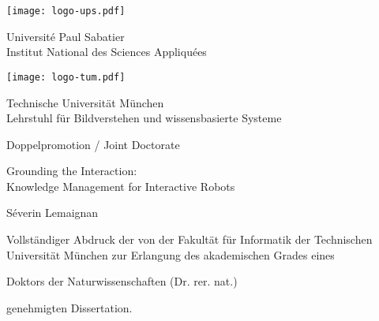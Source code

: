 \thispagestyle{empty}

\begin{center}

    \begin{minipage}{6cm}
      \begin{center}
        \texttt{[image: logo-ups.pdf]}
        \vspace{7mm}
        
        \textsf{\Large Université Paul Sabatier }\\
        \vspace{3mm}
        \textsf{\large Institut National des Sciences Appliquées}\\
      \end{center}
    \end{minipage}
    \hfill
    \begin{minipage}{6cm}
      \begin{center}
       \texttt{[image: logo-tum.pdf]}
        \vspace{7mm}
        
        \textsf{\Large Technische Universit{\"a}t M{\"u}nchen }\\
        \vspace{3mm}
        \textsf{\large Lehrstuhl f\"ur Bildverstehen und wissensbasierte Systeme}\\
      \end{center}
    \end{minipage}
      \begin{center}
        \textsf{\large Doppelpromotion / Joint Doctorate}\\
      \end{center}

\end{center}


\begin{center}
  \huge{Grounding the Interaction:\\Knowledge Management for Interactive Robots}

  \vspace{1cm}
  \Large{Séverin Lemaignan}
\end{center}

  \vspace{1cm} 
   \normalsize \noindent
     {Vollst\"andiger Abdruck der von der Fakult\"at f\"ur Informatik der Technischen Universit\"at
      M\"unchen zur Erlangung des akademischen Grades eines
      \begin{center}
        \large Doktors der Naturwissenschaften (Dr. rer. nat.)
      \end{center}
      \vspace{0.4ex}
      genehmigten Dissertation.}%

